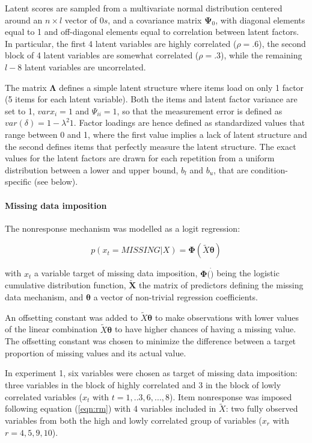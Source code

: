 	Latent scores are sampled from a multivariate normal distribution centered around an $n \times l$ 
	vector of $0s$, and a covariance matrix $\bm{\Psi}_0$, with diagonal elements equal to 1 and off-diagonal 
	elements equal to correlation between latent factors. In particular, the first 4 latent variables
	are highly correlated ($\rho = .6$), the second block of 4 latent variables are somewhat correlated 
	($\rho = .3$), while the remaining $l-8$ latent variables are uncorrelated.

	The matrix $\bm{\Lambda}$ defines a simple latent structure where items load on only 1 factor (5 items 
	for each latent variable). 
	Both the items and latent factor variance are set to 1, $var{x_i} = 1$ and $\Psi_{ii} = 1$, so that 
	the measurement error is defined as $var(\delta) = 1 - \lambda^{2} 1$. 
	Factor loadings are hence defined as standardized values that range between 0 and 1, where the first value 
	implies a lack of latent structure and the second defines items that perfectly measure the latent 
	structure.
	The exact values for the latent factors are drawn for each repetition from a uniform distribution between
	a lower and upper bound, $b_l$ and $b_u$, that are condition-specific (see below).

\paragraph{Missing data imposition}

	The nonresponse mechanism was modelled as a logit regression:

	\begin{equation} \label{eqn:rm}
		p(x_t = MISSING | X) = \bm{\Phi}(\tilde{X}\bm{\theta})
	\end{equation}

	with $x_t$ a variable target of missing data imposition, $\bm{\Phi}(\dot)$ being the logistic cumulative
	distribution function, $\bm{\tilde{X}}$ the matrix of predictors defining the missing data mechanism,
	and $\bm{\theta}$ a vector of non-trivial regression coefficients.
	
	An offsetting constant was added to $\tilde{X}\bm{\theta}$ to make observations with lower values of the 
	linear combination $\tilde{X}\bm{\theta}$ to have higher chances of having a missing value. The offsetting 
	constant was chosen to minimize the difference between a target proportion of missing values and its actual 
	value.

	In experiment 1, six variables were chosen as target of missing data imposition: three variables in the block of 
	highly correlated and 3 in the block of lowly correlated variables ($x_t$ with $t = 1,..3,6,...,8$). 
	Item nonresponse was imposed following equation (\ref{eqn:rm}) with 4 variables included in $\tilde{X}$: two fully 
	observed variables from both the high and lowly correlated group of variables ($x_r$ with $r = 4,5,9,10$).

